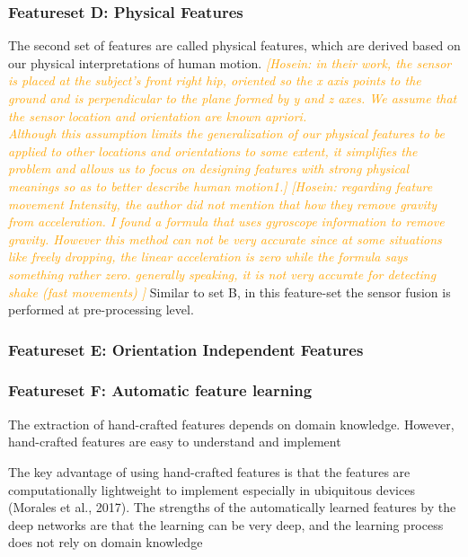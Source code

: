 \documentclass[journal,article,submit,moreauthors,pdftex]{Definitions/mdpi}
\newcommand{\hosein}[1]{\textcolor{orange}{{\it [Hosein: #1]}}}
\begin{document}
\subsubsection{Featureset D: Physical Features}
The second set of features are called physical features,
which are derived based on our physical interpretations of human motion.
\hosein{in their work, the sensor is placed at the subject’s front right hip, oriented so the x axis points to the ground and is perpendicular to the plane formed by y and z axes. We assume that the sensor location and orientation are known apriori.\\
Although this assumption limits the generalization of our physical features to be applied to other locations and orientations to some extent, it simplifies the problem and allows us to focus on designing features with strong physical meanings so as to better describe human motion1.}
\hosein{regarding feature movement Intensity, the author did not mention that how they remove gravity from acceleration. I found a formula that uses gyroscope information to remove gravity. However this method can not be very accurate since at some situations like freely dropping, the linear acceleration is zero while the formula says something rather zero. generally speaking, it is not very accurate for detecting shake (fast movements) }
Similar to set B, in this feature-set the sensor fusion is performed at pre-processing level.

\subsubsection{Featureset E: Orientation Independent Features}

\subsubsection{Featureset F: Automatic feature learning}

The extraction of hand-crafted features depends on domain knowledge. However, hand-crafted features are
easy to understand and implement

The key advantage of using hand-crafted features is that the features are computationally lightweight to implement especially in ubiquitous devices (Morales et al., 2017).
The strengths of the automatically learned features by the deep networks are that the learning can be very deep, and the learning process does not rely on domain knowledge
\end{document}
